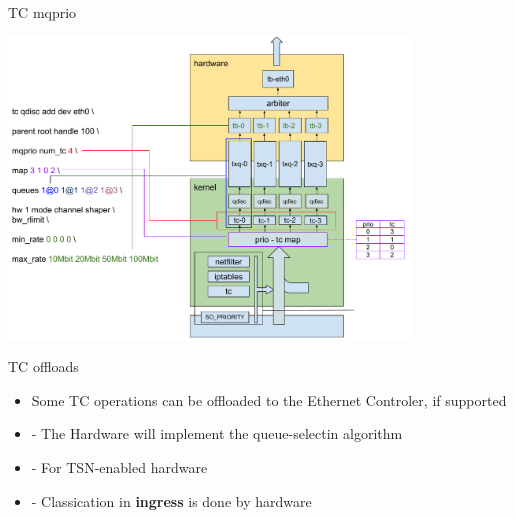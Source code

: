 \begin{frame}{TC mqprio}
	\begin{center}
		\includegraphics[width=0.8\textwidth]{slides/networking-traffic-control/TX_path_tc_mqprio.pdf}
	\end{center}
\end{frame}

\begin{frame}{TC offloads}
	\begin{itemize}
		\item Some TC operations can be offloaded to the Ethernet Controler, if supported
		\item {} - The Hardware will implement the queue-selectin algorithm
		\item {} - For TSN-enabled hardware
		\item {} - Classication in \textbf{ingress} is done by hardware
	\end{itemize}
\end{frame}


